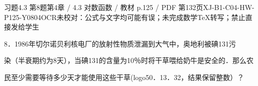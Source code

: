 \begin{bankitem}{习题4.3 第8题}{第4章 / 4.3 对数函数 / 教材 p.125 / PDF 第132页}{XJ-B1-C04-HW-P125-Y0804}{OCR未校对：公式与文字均可能有误；未完成数学TeX转写；禁止直接发给学生}
\begin{ocrdraft}
\par
8．1986年切尔诺贝利核电厂的放射性物质泄漏到大气中，奥地利被碘131污
\par
染（半衰期约为8天），当碘131的含量为10％时将干草喂给奶牛是安全的．那么农
\par
民至少需要等待多少天才能使用这些干草(logo50．13．32，结果保留整数）？
\end{ocrdraft}
\end{bankitem}
